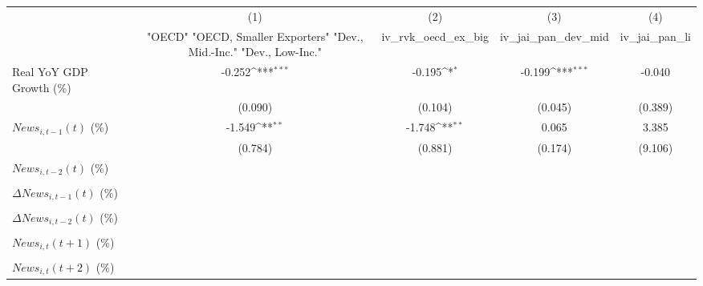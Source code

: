 {
\def\sym#1{\ifmmode^{#1}\else\(^{#1}\)\fi}
\begin{tabular}{l*{4}{c}}
\toprule
                    &\multicolumn{1}{c}{(1)}&\multicolumn{1}{c}{(2)}&\multicolumn{1}{c}{(3)}&\multicolumn{1}{c}{(4)}\\
                    &\multicolumn{1}{c}{ "OECD" "OECD, Smaller Exporters" "Dev., Mid.-Inc." "Dev., Low-Inc."}&\multicolumn{1}{c}{iv_rvk_oecd_ex_big}&\multicolumn{1}{c}{iv_jai_pan_dev_mid}&\multicolumn{1}{c}{iv_jai_pan_li}\\
\midrule
Real YoY GDP Growth (\%)&      -0.252\sym{***}&      -0.195\sym{*}  &      -0.199\sym{***}&      -0.040         \\
                    &     (0.090)         &     (0.104)         &     (0.045)         &     (0.389)         \\
\addlinespace
$ News_{i,t-1}(t)$ (\%)&      -1.549\sym{**} &      -1.748\sym{**} &       0.065         &       3.385         \\
                    &     (0.784)         &     (0.881)         &     (0.174)         &     (9.106)         \\
\addlinespace
$ News_{i,t-2}(t)$ (\%)&                     &                     &                     &                     \\
                    &                     &                     &                     &                     \\
\addlinespace
$ \Delta News_{i,t-1}(t)$ (\%)&                     &                     &                     &                     \\
                    &                     &                     &                     &                     \\
\addlinespace
$ \Delta News_{i,t-2}(t)$ (\%)&                     &                     &                     &                     \\
                    &                     &                     &                     &                     \\
\addlinespace
$ News_{i,t}(t+1)$ (\%)&                     &                     &                     &                     \\
                    &                     &                     &                     &                     \\
\addlinespace
$ News_{i,t}(t+2)$ (\%)&                     &                     &                     &                     \\

\end{tabular}}
